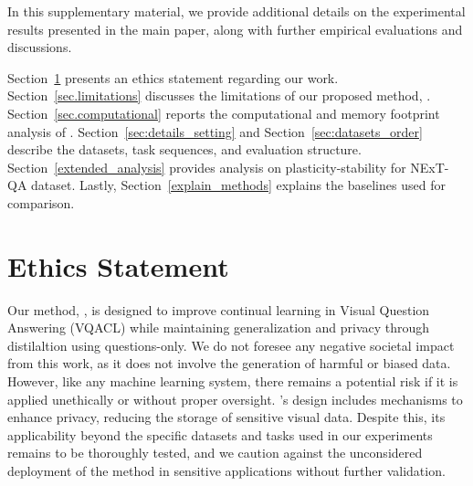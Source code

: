 \clearpage
\setcounter{page}{1}
\maketitlesupplementary

In this supplementary material, we provide additional details on the experimental results presented in the main paper, along with further empirical evaluations and discussions. 

Section~\ref{sec.ethics} presents an ethics statement regarding our work. Section~\ref{sec.limitations} discusses the limitations of our proposed method, \qstmethodshort{}. Section~\ref{sec.computational} reports the computational and memory footprint analysis of \qstmethodshort{}. Section~\ref{sec:details_setting} and Section~\ref{sec:datasets_order} describe the datasets, task sequences, and evaluation structure. Section~\ref{extended_analysis} provides analysis on plasticity-stability for NExT-QA dataset. Lastly, Section~\ref{explain_methods} explains the baselines used for comparison.

\section{Ethics Statement}
\label{sec.ethics}
Our method, \qstmethodshort{}, is designed to improve continual learning in Visual Question Answering (VQACL) while maintaining generalization and privacy through distilaltion using questions-only. We do not foresee any negative societal impact from this work, as it does not involve the generation of harmful or biased data. However, like any machine learning system, there remains a potential risk if it is applied unethically or without proper oversight. \qstmethodshort{}'s design includes mechanisms to enhance privacy, reducing the storage of sensitive visual data. Despite this, its applicability beyond the specific datasets and tasks used in our experiments remains to be thoroughly tested, and we caution against the unconsidered deployment of the method in sensitive applications without further validation.


